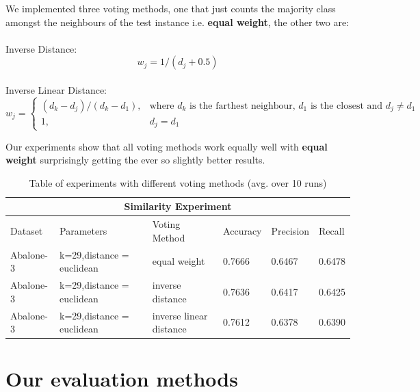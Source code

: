 We implemented three voting methods, one that just counts the majority class amongst the neighbours of the test instance i.e. {\bf equal weight}, the other two are: 
\\\\
Inverse Distance: 
\begin{equation}
w_j = 1/(d_j + 0.5)  
\end{equation}
\\
Inverse Linear Distance:
\begin{equation}
w_j = 
\begin{cases}
    (d_k - d_j)/(d_k - d_1),& \text{where } d_k \text{ is the farthest neighbour, }  d_1 \text{ is the closest and } d_j \neq d_1\\
    1,              &  d_j = d_1 
\end{cases}
\end{equation}

Our experiments show that all voting methods work equally well with {\bf equal weight} surprisingly getting the ever so slightly better results. 

\begin{table}[h]
\centering
\begin{tabular}{|p{2cm}|p{4.5cm}||p{2cm}|p{1.5cm}|p{1.5cm}|p{1.5cm}|}
 \hline
 \multicolumn{6}{|c|}{Similarity Experiment} \\
 \hline
 Dataset & Parameters & Voting Method & Accuracy & Precision & Recall\\
 \hline
 Abalone-3 & k=29,distance = euclidean &   equal weight & 0.7666  & 0.6467 & 0.6478\\
 \hline
 Abalone-3 & k=29,distance = euclidean & inverse distance & 0.7636 & 0.6417 & 0.6425\\
 \hline
 Abalone-3 & k=29,distance = euclidean &  inverse linear distance & 0.7612 & 0.6378 & 0.6390\\ 
 \hline

\end{tabular}
\caption{Table of experiments with different voting methods (avg. over 10 runs)}
\end{table}

\section{Our evaluation methods}

